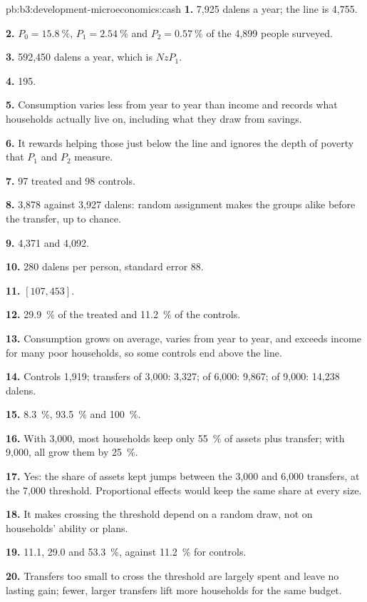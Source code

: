 \begin{solution}{pb:b3:development-microeconomics:cash}
\textbf{1.} 7{,}925 dalens a year; the line is 4{,}755.

\textbf{2.} $P_0 = 15.8~\%$, $P_1 = 2.54~\%$ and $P_2 = 0.57~\%$ of the 4{,}899 people surveyed.

\textbf{3.} 592{,}450 dalens a year, which is $N z P_1$.

\textbf{4.} 195.

\textbf{5.} Consumption varies less from year to year than income and records what
households actually live on, including what they draw from savings.

\textbf{6.} It rewards helping those just below the line and ignores the depth of
poverty that $P_1$ and $P_2$ measure.

\textbf{7.} 97 treated and 98 controls.

\textbf{8.} 3{,}878 against 3{,}927 dalens: random assignment makes the groups alike before the transfer, up to
chance.

\textbf{9.} 4{,}371 and 4{,}092.

\textbf{10.} 280 dalens per person, standard error 88.

\textbf{11.} $[107, 453]$.

\textbf{12.} 29.9~\% of the treated and 11.2~\% of the controls.

\textbf{13.} Consumption grows on average, varies from year to year, and exceeds income
for many poor households, so some controls end above the line.

\textbf{14.} Controls 1{,}919; transfers of 3{,}000: 3{,}327; of 6{,}000: 9{,}867; of 9{,}000: 14{,}238 dalens.

\textbf{15.} 8.3~\%, 93.5~\% and 100~\%.

\textbf{16.} With 3{,}000, most households keep only 55~\% of assets plus transfer; with 9{,}000, all grow them by 25~\%.

\textbf{17.} Yes: the share of assets kept jumps between the 3{,}000 and 6{,}000 transfers, at the 7{,}000 threshold.
Proportional effects would keep the same share at every size.

\textbf{18.} It makes crossing the threshold depend on a random draw, not on households'
ability or plans.

\textbf{19.} 11.1, 29.0 and 53.3~\%, against 11.2~\% for controls.

\textbf{20.} Transfers too small to cross the threshold are largely spent and leave no lasting gain;
fewer, larger transfers lift more households for the same budget.


\end{solution}
